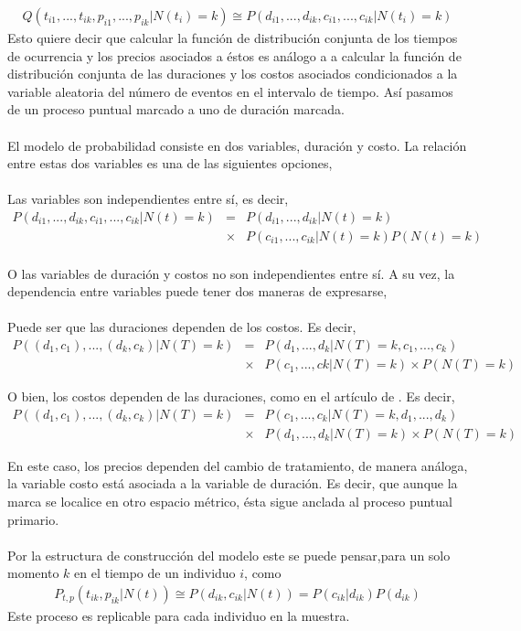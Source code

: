 \begin{align}
Q(t_{i1},...,t_{ik},p_{i1},...,p_{ik}|N(t_i)=k) \cong P(d_{i1},...,d_{ik},c_{i1},...,c_{ik}|N(t_i)=k)
\end{align}
Esto quiere decir que calcular la funci\'on de distribuci\'on conjunta de los tiempos de ocurrencia y los precios asociados a \'estos es an\'alogo a a calcular la funci\'on de distribuci\'on conjunta de las duraciones y los costos asociados condicionados a la variable aleatoria del n\'umero de eventos en el intervalo de tiempo. As\'i pasamos de un proceso puntual marcado a uno de duraci\'on marcada.\\
\\
El modelo de probabilidad consiste en dos variables, duraci\'on y costo. La relaci\'on entre estas dos variables es una de las siguientes opciones,\\
\\
Las variables son independientes entre s\'i, es decir,
\begin{eqnarray*}
P(d_{i1},...,d_{ik},c_{i1},...,c_{ik}|N(t)=k)&=&P(d_{i1},...,d_{ik}|N(t)=k)\\
&\times& P(c_{i1},...,c_{ik}|N(t)=k)P(N(t)=k)
\end{eqnarray*}
\\
O las variables de duraci\'on y costos no son independientes entre s\'i. A su vez, la dependencia entre variables puede tener dos maneras de expresarse,\\
\\
Puede ser que las duraciones dependen de los costos. Es decir,
\begin{eqnarray*}
	P((d_1,c_1),...,(d_k,c_k)|N(T)=k)&=& P(d_1,...,d_k|N(T)=k,c_1,...,c_k)\\
								 &\times& P(c_1,...,ck|N(T)=k)\times P(N(T)=k)
\end{eqnarray*}

O bien, los costos dependen de las duraciones, como en el art\'iculo de \cite{engle1998autoregressive}. Es decir,
	\begin{eqnarray*}
     P((d_1,c_1),...,(d_k,c_k)|N(T)=k)&=& P(c_1,...,c_k|N(T)=k,d_1,...,d_k)\\
								 &\times& P(d_1,...,d_k|N(T)=k)\times P(N(T)=k)
    \end{eqnarray*}	

En este caso, los precios dependen del cambio de tratamiento, de manera an\'aloga, la variable costo est\'a asociada a la variable de duraci\'on. Es decir, que aunque la marca se localice en otro espacio m\'etrico, \'esta sigue anclada al proceso puntual primario.\\
\\
Por la estructura de construcci\'on del modelo este se puede pensar,para un solo momento $k$ en el tiempo de un individuo $i$, como
\begin{align}
P_{t,p}(t_{ik},p_{ik}|N(t))\cong P(d_{ik},c_{ik}|N(t)) = P(c_{ik}|d_{ik})P(d_{ik})
\end{align}
Este proceso es replicable para cada individuo en la muestra.
